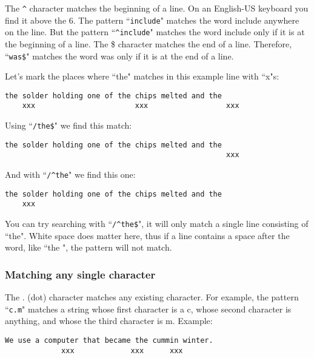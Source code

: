 The \texttt{\^{}} character matches the beginning of a line.
On an English-US keyboard you find it above the 6.
The pattern ``\texttt{include}" matches the word include anywhere on the line.
But the pattern ``\texttt{\^{}include}" matches the word include only if it is at the beginning of a line.
The \$ character matches the end of a line.
Therefore, ``\texttt{was\$}" matches the word was only if it is at the end of a line.

Let's mark the places where ``the" matches in this example line with ``x"s:

		\begin{Verbatim}[samepage=true]
    the solder holding one of the chips melted and the 
    xxx                       xxx                  xxx
		\end{Verbatim}

Using ``\texttt{/the\$}" we find this match:

		\begin{Verbatim}[samepage=true]
    the solder holding one of the chips melted and the 
                                                   xxx
		\end{Verbatim}

And with ``\texttt{/\^{}the}" we find this one:

		\begin{Verbatim}[samepage=true]
    the solder holding one of the chips melted and the 
    xxx
		\end{Verbatim}

You can try searching with ``\texttt{/\^{}the\$}", it will only match a single line consisting of ``the".
White space does matter here, thus if a line contains a space after the word, like ``the ", the pattern will not match.

\subsubsection{Matching any single character}

The . (dot) character matches any existing character.
For example, the pattern ``\texttt{c.m}" matches a string whose first character is a c, whose second character is anything, and whose the third character is m.
Example:

		\begin{Verbatim}[samepage=true]
    We use a computer that became the cummin winter. 
             xxx             xxx      xxx
		\end{Verbatim}


